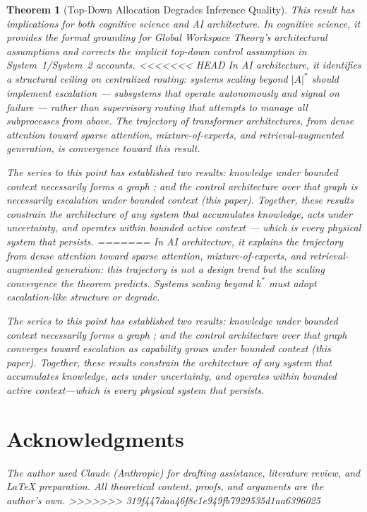 \documentclass[11pt]{article}
\newtheorem{theorem}{Theorem}
\theoremstyle{definition}
\begin{document}
\begin{theorem}[Top-Down Allocation Degrades Inference Quality]
This result has implications for both cognitive science and AI
architecture. In cognitive science, it provides the formal grounding
for Global Workspace Theory's architectural assumptions and corrects
the implicit top-down control assumption in System~1/System~2 accounts.
<<<<<<< HEAD
In AI architecture, it identifies a structural ceiling on centralized
routing: systems scaling beyond $|A|^*$ should implement escalation ---
subsystems that operate autonomously and signal on failure --- rather
than supervisory routing that attempts to manage all subprocesses from
above. The trajectory of transformer architectures, from dense
attention toward sparse attention, mixture-of-experts, and
retrieval-augmented generation, is convergence toward this result.

The series to this point has established two results: knowledge under
bounded context necessarily forms a graph \cite{McCarthy2026a}; and the
control architecture over that graph is necessarily escalation under
bounded context (this paper). Together, these results constrain the
architecture of any system that accumulates knowledge, acts under
uncertainty, and operates within bounded active context --- which is
every physical system that persists.
=======
In AI architecture, it explains the trajectory from dense attention
toward sparse attention, mixture-of-experts, and retrieval-augmented
generation: this trajectory is not a design trend but the scaling
convergence the theorem predicts. Systems scaling beyond $k^*$
\emph{must} adopt escalation-like structure or degrade.

The series to this point has established two results: knowledge under
bounded context necessarily forms a graph \cite{McCarthy2026a}; and
the control architecture over that graph converges toward escalation
as capability grows under bounded context (this paper). Together,
these results constrain the architecture of any system that
accumulates knowledge, acts under uncertainty, and operates within
bounded active context---which is every physical system that persists.

\section*{Acknowledgments}

The author used Claude (Anthropic) for drafting assistance, literature review, and \LaTeX{} preparation. All theoretical content, proofs, and arguments are the author's own.
>>>>>>> 319f447daa46f8c1e949fb7929535d1aa6396025


\end{theorem}
\end{document}
